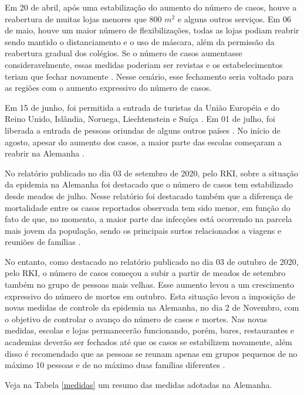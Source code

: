 \documentclass[12pt]{article}
\begin{document}
Em 20 de abril, após uma estabilização do aumento do número de casos, houve a reabertura de muitas lojas menores que 800 $m^2$ e alguns outros serviços. Em 06 de maio, houve um maior número de flexibilizações, todas as lojas podiam reabrir sendo mantido o distanciamento e o uso de máscara, além da permissão da reabertura gradual dos colégios. Se o número de casos aumentasse consideravelmente, essas medidas poderiam ser revistas e os estabelecimentos teriam que fechar novamente \cite{wieland2020flatten, bbc06.05, tg06.05}. Nesse cenário, esse fechamento seria voltado para as regiões com o aumento expressivo do número de casos.

Em 15 de junho, foi permitida a entrada de turistas da União Européia  e do Reino Unido, Islândia, Noruega, Liechtenstein e Suíça \cite{dw}. Em 01 de julho, foi liberada a entrada de pessoas oriundas de alguns outros países \cite{sgvi}. No início de agosto, apesar do aumento dos casos, a maior parte das escolas começaram a reabrir na Alemanha \cite{fortuneschool}.

No relatório publicado no dia 03 de setembro de 2020, pelo RKI, sobre a situação da epidemia na Alemanha foi destacado que o número de casos tem estabilizado desde meados de julho. Nesse relatório foi destacado também que a diferença de mortalidade entre os casos reportados observada tem sido menor, em função do fato de que, no momento, a maior parte das infecções está ocorrendo na parcela mais jovem da população, sendo os principais surtos relacionados a viagens e reuniões de famílias \cite{RKI}.

No entanto, como destacado no relatório publicado no dia 03 de outubro de 2020, pelo RKI, o número de casos começou a subir a partir de meados de setembro também no grupo de pessoas mais velhas. Esse aumento levou a um crescimento expressivo do número de mortos em outubro. Esta situação levou a imposição de novas medidas de controle da epidemia na Alemanha, no dia 2 de Novembro, com o objetivo de controlar o avanço do número de casos e mortes. Nas novas medidas, escolas e lojas permanecerão funcionando, porém, bares, restaurantes e academias deverão ser fechados até que os casos se estabilizem novamente, além disso é recomendado que as pessoas se reunam apenas em grupos pequenos de no máximo 10 pessoas e de no máximo duas famílias diferentes \cite{2lock1, 2lock2}.

 Veja na Tabela \ref{medidas} um resumo das medidas adotadas na Alemanha.
\end{document}
